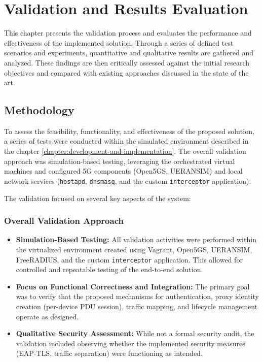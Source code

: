 \chapter{Validation and Results Evaluation}%
\label{chapter:validation-and-results-evaluation}

\begin{introduction}
This chapter presents the validation process and evaluates the performance and effectiveness of the implemented solution. Through a series of defined test scenarios and experiments, quantitative and qualitative results are gathered and analyzed. These findings are then critically assessed against the initial research objectives and compared with existing approaches discussed in the state of the art.
\end{introduction}

\section{Methodology}

To assess the feasibility, functionality, and effectiveness of the proposed solution, a series of tests were conducted within the simulated environment described in the chapter \ref{chapter:development-and-implementation}. The overall validation approach was simulation-based testing, leveraging the orchestrated virtual machines and configured \ac{5G} components (Open5GS, UERANSIM) and local network services (\texttt{hostapd}, \texttt{dnsmasq}, and the custom \texttt{interceptor} application).

The validation focused on several key aspects of the system:

\subsection{Overall Validation Approach}

\begin{itemize}
    \item \textbf{Simulation-Based Testing:} All validation activities were performed within the virtualized environment created using Vagrant, Open5GS, UERANSIM, FreeRADIUS, and the custom \texttt{interceptor} application. This allowed for controlled and repeatable testing of the end-to-end solution.

    \item \textbf{Focus on Functional Correctness and Integration:} The primary goal was to verify that the proposed mechanisms for authentication, proxy identity creation (per-device \ac{PDU} session), traffic mapping, and lifecycle management operate as designed.

    \item \textbf{Qualitative Security Assessment:} While not a formal security audit, the validation included observing whether the implemented security measures (\ac{EAP-TLS}, traffic separation) were functioning as intended.
\end{itemize}

